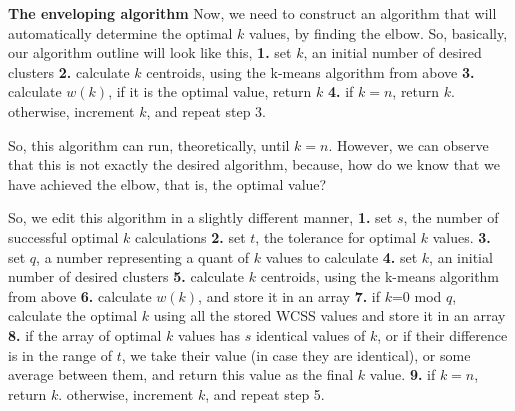 \documentclass[12pt]{article}
\begin{document}
\newpage
\textbf{The enveloping algorithm}
Now, we need to construct an algorithm that will automatically determine the optimal $k$ values, by finding the elbow. So, basically, our algorithm outline will look like this, \newline
\textbf{1.} set $k$, an initial number of desired clusters \newline
\textbf{2.} calculate $k$ centroids, using the k-means algorithm from above \newline
\textbf{3.} calculate $w(k)$, if it is the optimal value, return $k$ \newline
\textbf{4.} if $k=n$, return $k$. otherwise, increment $k$, and repeat step 3. \newline

So, this algorithm can run, theoretically, until \( k=n \). \newline
However, we can observe that this is not exactly the desired algorithm, because, \newline
how do we know that we have achieved the elbow, that is, the optimal value? \newline

So, we edit this algorithm in a slightly different manner,\newline
\textbf{1.} set $s$, the number of successful optimal $k$ calculations \newline
\textbf{2.} set $t$, the tolerance for optimal $k$ values. \newline
\textbf{3.} set $q$, a number representing a quant of $k$ values to calculate \newline
\textbf{4.} set $k$, an initial number of desired clusters \newline
\textbf{5.} calculate $k$ centroids, using the k-means algorithm from above \newline
\textbf{6.} calculate $w(k)$, and store it in an array \newline
\textbf{7.} if $k$=0 mod $q$, calculate the optimal $k$ using all the stored WCSS values and store it in an array \newline
\textbf{8.} if the array of optimal $k$ values has $s$ identical values of $k$, or if their difference is in the range of $t$, we take their value (in case they are identical), or some average between them, and return this value as the final $k$ value. \newline
\textbf{9.} if $k=n$, return $k$. otherwise, increment $k$, and repeat step 5. \newline
\end{document}
